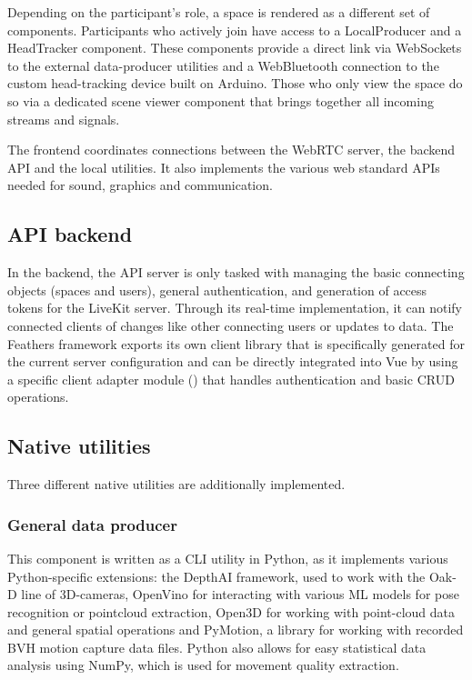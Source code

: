 Depending on the participant's role, a space is rendered as a different set of components. Participants who actively join have access to a LocalProducer and a HeadTracker component. These components provide a direct link via WebSockets to the external data-producer utilities and a WebBluetooth connection to the custom head-tracking device built on Arduino. Those who only view the space do so via a dedicated scene viewer component that brings together all incoming streams and signals.

The frontend coordinates connections between the WebRTC server, the backend \ac{API} and the local utilities. It also implements the various web standard \ac{API}s needed for sound, graphics and communication.

\subsection{API backend}

In the backend, the \ac{API} server is only tasked with managing the basic connecting objects (spaces and users), general authentication, and generation of access tokens for the LiveKit server. Through its real-time implementation, it can notify connected clients of changes like other connecting users or updates to data. The Feathers framework exports its own client library that is specifically generated for the current server configuration and can be directly integrated into Vue by using a specific client adapter module () that handles authentication and basic \ac{CRUD} operations.

\subsection{Native utilities}

Three different native utilities are additionally implemented.

\subsubsection{General data producer}

This component is written as a \ac{CLI} utility in Python, as it implements various Python-specific extensions: the DepthAI framework, used to work with the Oak-D line of \ac{3D}-cameras, OpenVino for interacting with various \ac{ML} models for pose recognition or pointcloud extraction, Open3D for working with point-cloud data and general spatial operations and PyMotion, a library for working with recorded \ac{BVH} motion capture data files. Python also allows for easy statistical data analysis using NumPy, which is used for movement quality extraction.

